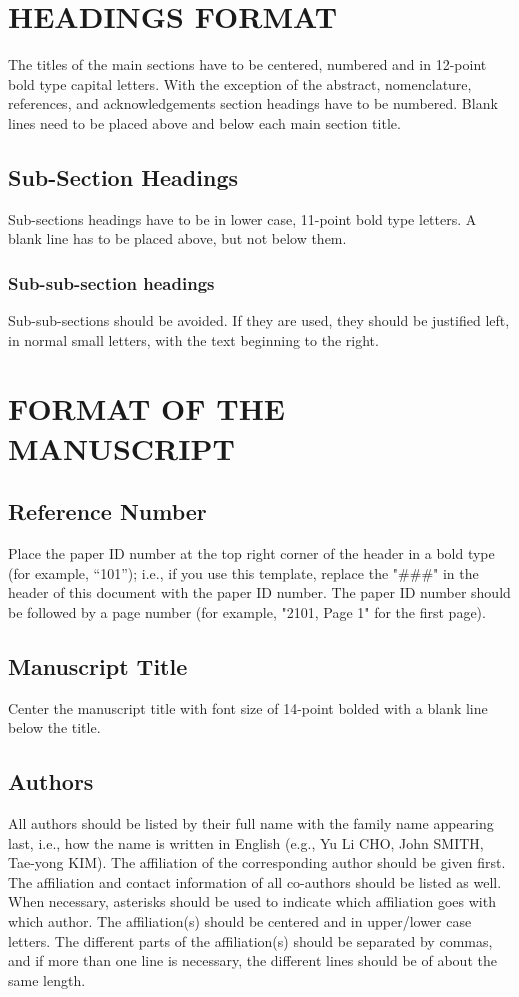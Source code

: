 \documentclass[10pt]{extarticle}
\begin{document}
\section{HEADINGS FORMAT}

The titles of the main sections have to be centered, numbered and in 12-point bold type capital letters.  With the exception of the abstract, nomenclature, references, and acknowledgements section headings have to be numbered. Blank lines need to be placed above and below each main section title.

\subsection{Sub-Section Headings}
Sub-sections headings have to be in lower case, 11-point bold type letters.  A blank line has to be placed above, but not below them.

\subsubsection{Sub-sub-section headings} Sub-sub-sections should be avoided. If they are used, they should be justified left, in normal small letters, with the text beginning to the right.

\section{FORMAT OF THE MANUSCRIPT}

\subsection{Reference Number}
Place the paper ID number at the top right corner of the header in a bold type (for example, “101”); i.e., if you use this template, replace the "\#\#\#" in the header of this document with the paper ID number. The paper ID number should be followed by a page number (for example, "2101, Page 1" for the first page). 

\subsection{Manuscript Title}
Center the manuscript title with font size of 14-point bolded with a blank line below the title.

\subsection{Authors}
All authors should be listed by their full name with the family name appearing last, i.e., how the name is written in English (e.g., Yu Li CHO, John SMITH, Tae-yong KIM). The affiliation of the corresponding author should be given first.  The affiliation and contact information of all co-authors should be listed as well.  When necessary, asterisks should be used to indicate which affiliation goes with which author.  The affiliation(s) should be centered and in upper/lower case letters.  The different parts of the affiliation(s) should be separated by commas, and if more than one line is necessary, the different lines should be of about the same length.
\end{document}
